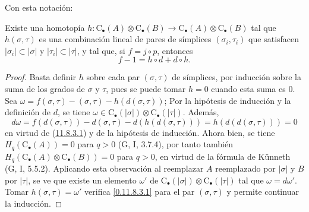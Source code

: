 Con esta notación:
\begin{proposition}[11.8.3]
\label{0.11.8.3}
\label{0.11.8.3-fr}
Existe una homotopía
$h:\mathrm C_\bullet(A)\otimes\mathrm C_\bullet(B)\longrightarrow\mathrm C_\bullet(A)\otimes\mathrm C_\bullet(B)$
tal que $h(\sigma,\tau)$ es una combinación lineal de pares de símplices
$(\sigma_i,\tau_i)$ que satisfacen
$|\sigma_i|\subset|\sigma|$ y $|\tau_i|\subset|\tau|$, y tal que,
si $f=j\circ p$, entonces
\[
\label{0.11.8.3.1-fr}
\tag{11.8.3.1}
f-1=h\circ d+d\circ h.
\]
\end{proposition}

\begin{proof}
Basta definir $h$ sobre cada par $(\sigma,\tau)$ de símplices, por
inducción sobre la suma de los grados de $\sigma$ y $\tau$, pues se puede tomar $h=0$ cuando esta suma es $0$. Sea
$\omega=f(\sigma,\tau)-(\sigma,\tau)-h(d(\sigma,\tau))$;
Por la hipótesis de inducción y la definición de $d$, se tiene
$\omega\in\mathrm C_\bullet(|\sigma|)\otimes\mathrm C_\bullet(|\tau|)$.
Además,
\[
d\omega=f(d(\sigma,\tau))-d(\sigma,\tau)-d(h(d(\sigma,\tau)))
=h(d(d(\sigma,\tau)))=0
\]
en virtud de (\hyperref[0.11.8.3.1-fr]{11.8.3.1}) y de la hipótesis de inducción. Ahora bien, se tiene $H_q(\mathrm C_\bullet(A))=0$ para $q>0$ (G, I, 3.7.4), por tanto también $H_q(\mathrm C_\bullet(A)\otimes\mathrm C_\bullet(B))=0$ para $q>0$, en virtud de la fórmula de Künneth (G, I, 5.5.2). Aplicando esta observación al reemplazar $A$ reemplazado por $|\sigma|$ y $B$ por
$|\tau|$, se ve que existe un elemento $\omega'$ de $\mathrm C_\bullet(|\sigma|)\otimes\mathrm C_\bullet(|\tau|)$ tal que $\omega=d\omega'$.
Tomar $h(\sigma,\tau)=\omega'$ verifica \eqref{0.11.8.3.1} para el par
$(\sigma,\tau)$ y permite continuar la inducción.
\end{proof}

